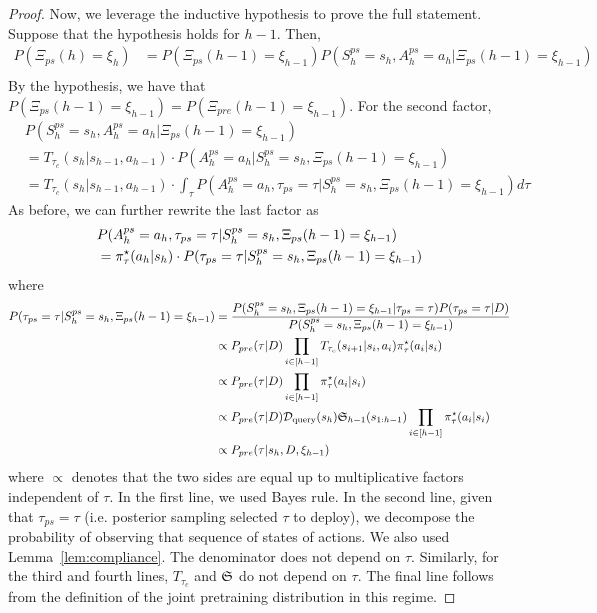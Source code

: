 \begin{proof}
Now, we leverage the inductive hypothesis to prove the full statement. Suppose that the hypothesis holds for $h - 1$. Then, 
\begin{align}
    P(\Xi_{ps}(h) = \xi_h) & = P(\Xi_{ps}(h - 1) = \xi_{h - 1})  P(S^{ps}_{h} = s_h, A^{ps}_h = a_h | \Xi_{ps}(h - 1) = \xi_{h - 1}) \\
\end{align}
By the hypothesis, we have that $P(\Xi_{ps}(h - 1) = \xi_{h - 1}) = P(\Xi_{pre}(h - 1) = \xi_{h - 1}) $.  For the second factor,
\begin{align}
     & P(S^{ps}_{h} = s_h, A^{ps}_h = a_h | \Xi_{ps}(h - 1) = \xi_{h - 1}) \\
     & = T_{\tau_c} ( s_h | s_{h - 1},  a_{h - 1})  \cdot P(A_h^{ps} = a_h | S^{ps}_h = s_h, \Xi_{ps}(h - 1) = \xi_{h - 1})\\
      & = T_{\tau_c} (s_h |  s_{h - 1}, a_{h - 1}) \cdot  \int_{\tau} P(A_h^{ps} = a_h, \tau_{ps} = \tau | S^{ps}_h = s_h, \Xi_{ps}(h - 1) = \xi_{h - 1}) d\tau
\end{align}
As before, we can further rewrite the last factor as
\begin{align}
    & P(A_h^{ps} = a_h, \tau_{ps} = \tau | S^{ps}_h = s_h, \Xi_{ps}(h - 1) = \xi_{h - 1}) \\
    & = \pi^{\star}_{\tau}(a_h | s_h) \cdot P(\tau_{ps} = \tau  |  S^{ps}_h = s_h,  \Xi_{ps}(h - 1) = \xi_{h - 1})
\end{align}
where
\begin{align}
    P(\tau_{ps} = \tau  |  S^{ps}_h = s_h,  \Xi_{ps}(h - 1) = \xi_{h - 1}) 
    & = \frac{P(S^{ps}_h = s_h, \Xi_{ps}(h - 1) = \xi_{h - 1 }  | \tau_{ps} = \tau ) P(\tau_{ps} = \tau | D) } {P(S^{ps}_h = s_h, \Xi_{ps}(h - 1) = \xi_{h - 1 } )} \\
    & \propto P_{pre}(\tau | D)\prod_{i \in [h - 1]} T_{\tau_c} ( s_{i + 1} | s_i, a_i)  \pi^{\star}_{\tau}(a_i | s_i) \\
    & \propto P_{pre}(\tau | D)\prod_{i \in [h - 1]} \pi^{\star}_{\tau}(a_i | s_i) \\
    & \propto P_{pre}(\tau | D) \mathcal{D}_{\text{query}}(s_h) {\mathfrak{S}}_{h - 1} (s_{1:h - 1}) \prod_{i \in [h - 1]}  \pi^{\star}_{\tau}(a_i | s_i) \\
    & \propto P_{pre}(\tau | s_h, D, \xi_{h - 1})  \\
\end{align}
where $\propto$ denotes that the two sides are equal up to multiplicative factors independent of $\tau$.  In the first line, we used Bayes rule. In the second line, given that $\tau_{ps} = \tau$ (i.e. posterior sampling selected $\tau$ to deploy),  we decompose the probability of observing that sequence of states of actions. We also used Lemma~\ref{lem:compliance}. The denominator does not depend on $\tau$. Similarly, for the third and fourth lines, $T_{\tau_c}$ and ${\mathfrak{S}}$ do not depend on $\tau$. The final line follows from the definition of the joint pretraining distribution in this regime.



\end{proof}
